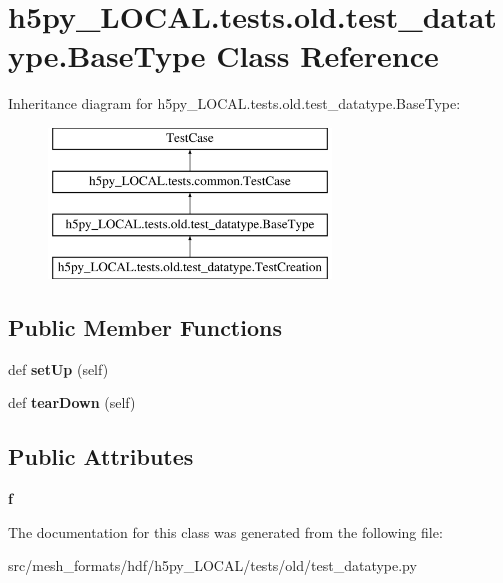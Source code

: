 \hypertarget{classh5py__LOCAL_1_1tests_1_1old_1_1test__datatype_1_1BaseType}{}\section{h5py\+\_\+\+L\+O\+C\+A\+L.\+tests.\+old.\+test\+\_\+datatype.\+Base\+Type Class Reference}
\label{classh5py__LOCAL_1_1tests_1_1old_1_1test__datatype_1_1BaseType}
Inheritance diagram for h5py\+\_\+\+L\+O\+C\+A\+L.\+tests.\+old.\+test\+\_\+datatype.\+Base\+Type\+:\begin{figure}[H]
\begin{center}
\leavevmode
\includegraphics[height=4.000000cm]{classh5py__LOCAL_1_1tests_1_1old_1_1test__datatype_1_1BaseType}
\end{center}
\end{figure}
\subsection*{Public Member Functions}
\begin{DoxyCompactItemize}
\item 
\mbox{\label{classh5py__LOCAL_1_1tests_1_1old_1_1test__datatype_1_1BaseType_afe42f6d93aa97c7fee2125999575cf84}} 
def {\bfseries set\+Up} (self)
\item 
\mbox{\label{classh5py__LOCAL_1_1tests_1_1old_1_1test__datatype_1_1BaseType_a3cf9e539fcc6a2e2fd878cb2d7001ab6}} 
def {\bfseries tear\+Down} (self)
\end{DoxyCompactItemize}
\subsection*{Public Attributes}
\begin{DoxyCompactItemize}
\item 
\mbox{\label{classh5py__LOCAL_1_1tests_1_1old_1_1test__datatype_1_1BaseType_a07716e472731e4e735c122f469234f5f}} 
{\bfseries f}
\end{DoxyCompactItemize}


The documentation for this class was generated from the following file\+:\begin{DoxyCompactItemize}
\item 
src/mesh\+\_\+formats/hdf/h5py\+\_\+\+L\+O\+C\+A\+L/tests/old/test\+\_\+datatype.\+py\end{DoxyCompactItemize}

